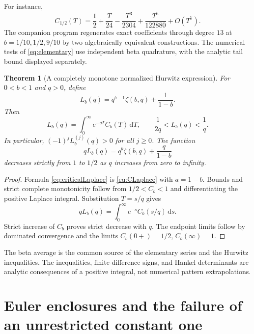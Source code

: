 \documentclass[11pt]{article}
\numberwithin{equation}{section}
\newtheorem{theorem}{Theorem}[section]
\theoremstyle{definition}\newtheorem{definition}[theorem]{Definition}
\theoremstyle{remark}\newtheorem{remark}[theorem]{Remark}
\newcommand{\dd}{\,\mathrm d}
\begin{document}
For instance,
\begin{equation}\label{eq:Cexample}
 C_{1/2}(T)=\frac12+\frac{T}{24}-\frac{T^3}{2304}
                       +\frac{T^5}{122880}+O(T^7).
\end{equation}
The companion program regenerates exact coefficients through degree
$13$ at $b=1/10,1/2,9/10$ by two algebraically equivalent constructions.
The numerical tests of \eqref{eq:elementary} use independent beta
quadrature, with the analytic tail bound displayed separately.

\begin{theorem}[A completely monotone normalized Hurwitz expression]
\label{thm:hurwitzcm}
For $0<b<1$ and $q>0$, define
\begin{equation}\label{eq:L}
 L_b(q)=q^{b-1}\zeta(b,q)+\frac1{1-b}.
\end{equation}
Then
\begin{equation}\label{eq:criticalLaplace}
 L_b(q)=\int_0^\infty e^{-qT}C_b(T)\dd T,
 \qquad \frac1{2q}<L_b(q)<\frac1q.
\end{equation}
In particular, $(-1)^jL_b^{(j)}(q)>0$ for all $j\ge0$.
The function
\begin{equation}\label{eq:normalizedHurwitz}
 qL_b(q)=q^b\zeta(b,q)+\frac q{1-b}
\end{equation}
decreases strictly from $1$ to $1/2$ as $q$ increases from zero to
infinity.
\end{theorem}
\begin{proof}
Formula \eqref{eq:criticalLaplace} is \eqref{eq:CLaplace} with
$a=1-b$. Bounds and strict complete monotonicity follow from
$1/2<C_b<1$ and differentiating the positive Laplace integral.
Substitution $T=s/q$ gives
\[
 qL_b(q)=\int_0^\infty e^{-s}C_b(s/q)\dd s.
\]
Strict increase of $C_b$ proves strict decrease with $q$.
The endpoint limits follow by dominated convergence and the limits
$C_b(0+)=1/2$, $C_b(\infty)=1$.
\end{proof}

The beta average is the common source of the elementary series and
the Hurwitz inequalities. The inequalities, finite-difference signs,
and Hankel determinants are analytic consequences of a positive
integral, not numerical pattern extrapolations.

\section{Euler enclosures and the failure of an unrestricted constant one}
\label{sec:euler}
\end{document}
